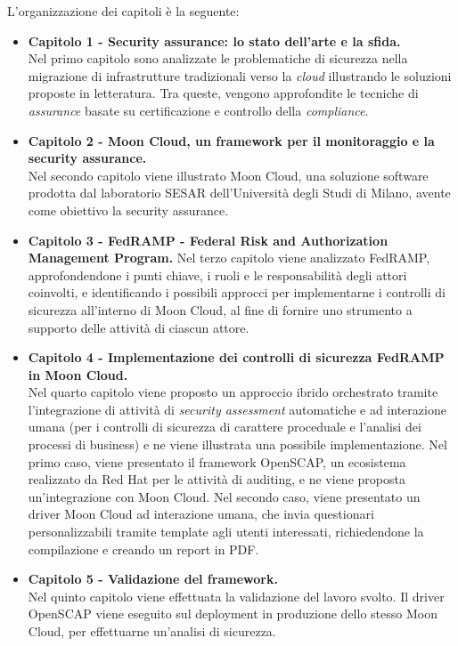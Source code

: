 \documentclass[../main.tex]{subfiles}
\begin{document}
L'organizzazione dei capitoli è la seguente:
\begin{itemize}
    \item \textbf{Capitolo 1 - Security assurance: lo stato dell'arte e la sfida.}
        \\Nel primo capitolo sono analizzate le problematiche di sicurezza nella migrazione di infrastrutture tradizionali verso la \textit{cloud} illustrando le soluzioni proposte in letteratura.
        Tra queste, vengono approfondite le tecniche di \textit{assurance} basate su certificazione e controllo della \textit{compliance}.
    \item \textbf{Capitolo 2 - Moon Cloud, un framework per il monitoraggio e la security assurance.}
        \\Nel secondo capitolo viene illustrato Moon Cloud, una soluzione software prodotta dal laboratorio SESAR dell'Università degli Studi di Milano, avente come obiettivo la security assurance.
    \item \textbf{Capitolo 3 - FedRAMP - Federal Risk and Authorization Management Program.}
        Nel terzo capitolo viene analizzato FedRAMP, approfondendone i punti chiave, i ruoli e le responsabilità degli attori coinvolti, e identificando
        i possibili approcci per implementarne i controlli di sicurezza all'interno di Moon Cloud, al fine di fornire uno strumento a supporto delle attività di ciascun attore.
    \item \textbf{Capitolo 4 - Implementazione dei controlli di sicurezza FedRAMP in Moon Cloud.}\\
        Nel quarto capitolo viene proposto un approccio ibrido orchestrato tramite l'integrazione di attività di \textit{security assessment} automatiche e ad interazione umana (per i controlli di sicurezza di carattere proceduale e l'analisi dei processi di business)
        e ne viene illustrata una possibile implementazione.
        Nel primo caso, viene presentato il framework OpenSCAP, un ecosistema realizzato da Red Hat per le attività di auditing, e ne viene proposta un'integrazione con Moon Cloud.
        Nel secondo caso, viene presentato un driver Moon Cloud ad interazione umana, che invia questionari personalizzabili tramite template agli utenti interessati, richiedendone la compilazione e creando un report in PDF.
    \item \textbf{Capitolo 5 - Validazione del framework.}\\
        Nel quinto capitolo viene effettuata la validazione del lavoro svolto. Il driver OpenSCAP viene eseguito sul deployment in produzione dello stesso Moon Cloud, per effettuarne un'analisi di sicurezza.

\end{itemize}
\end{document}
